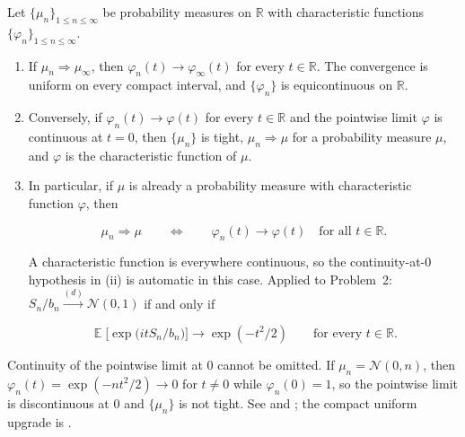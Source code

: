 \documentclass[11pt,a4paper]{article}
\DeclareMathOperator{\E}{\mathbb{E}}
\begin{document}
\begin{theorem}
\label{thm:levy-continuity}
Let \(\{\mu_{n}\}_{1 \le n \le \infty}\) be probability measures on \(\mathbb{R}\) with characteristic functions \(\{\varphi_{n}\}_{1 \le n \le \infty}\).

\begin{enumerate}[label=\textup{(\roman*)}]
    \item
    If \(\mu_{n} \Rightarrow \mu_{\infty}\), then \(\varphi_{n}(t) \to \varphi_{\infty}(t)\) for every \(t \in \mathbb{R}\). The convergence is uniform on every compact interval, and \(\{\varphi_{n}\}\) is equicontinuous on \(\mathbb{R}\).

    \item
    Conversely, if \(\varphi_{n}(t) \to \varphi(t)\) for every \(t \in \mathbb{R}\) and the pointwise limit \(\varphi\) is continuous at \(t = 0\), then \(\{\mu_{n}\}\) is tight, \(\mu_{n} \Rightarrow \mu\) for a probability measure \(\mu\), and \(\varphi\) is the characteristic function of \(\mu\).

    \item
    In particular, if \(\mu\) is already a probability measure with characteristic function \(\varphi\), then

\[
\mu_{n} \Rightarrow \mu
\qquad\Longleftrightarrow\qquad
\varphi_{n}(t) \to \varphi(t)
\quad \text{for all } t \in \mathbb{R}.
\]

    A characteristic function is everywhere continuous, so the continuity-at-\(0\) hypothesis in (ii) is automatic in this case. Applied to Problem~2: \(S_{n}/b_{n} \xrightarrow{(d)} \mathcal{N}(0,1)\) if and only if

\[
\E\bigl[\exp\bigl(it S_{n}/b_{n}\bigr)\bigr]
\to
\exp(-t^{2}/2)
\qquad \text{for every } t \in \mathbb{R}.
\]
\end{enumerate}

Continuity of the pointwise limit at \(0\) cannot be omitted. If \(\mu_{n} = \mathcal{N}(0,n)\), then \(\varphi_{n}(t) = \exp(-nt^{2}/2) \to 0\) for \(t \neq 0\) while \(\varphi_{n}(0) = 1\), so the pointwise limit is discontinuous at \(0\) and \(\{\mu_{n}\}\) is not tight. See \citep[Theorem~3.3.6]{durrett2010} and \citep[Theorems~6.3.1 and~6.3.2]{chung1968}; the compact uniform upgrade is \citep[Exercise~3.3.16(ii)]{durrett2010}.
\end{theorem}
\end{document}
